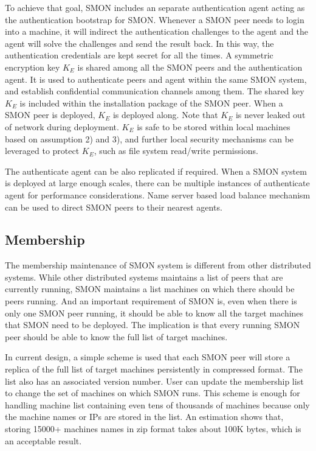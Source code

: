 To achieve that goal, SMON includes an separate
authentication agent acting as the authentication bootstrap
for SMON.  Whenever a SMON peer needs to login into a
machine, it will indirect the authentication challenges to
the agent and the agent will solve the challenges and send
the result back. In this way, the authentication credentials
are kept secret for all the times. A symmetric encryption
key $K_E$ is shared among all the SMON peers and the
authentication agent. It is used to authenticate peers and
agent within the same SMON system, and establish
confidential communication channels among them. The shared
key $K_E$ is included within the installation package of the
SMON peer. When a SMON peer is deployed, $K_E$ is deployed
along. Note that $K_E$ is never leaked out of network during
deployment. $K_E$ is safe to be stored within local machines
based on assumption 2) and 3), and further local security
mechanisms can be leveraged to protect $K_E$, such as file
system read/write permissions.


The authenticate agent can be also replicated if required.
When a SMON system is deployed at large enough scales, there
can be multiple instances of authenticate agent for
performance considerations. Name server based load balance
mechanism\cite{} can be used to direct SMON peers to their
nearest agents.

\subsection{Membership}

The membership maintenance of SMON system is different from
other distributed systems. While other distributed systems
maintains a list of peers that are currently running, SMON
maintains a list machines on which there should be peers
running.  And an important requirement of SMON is, even when
there is only one SMON peer running, it should be able to
know all the target machines that SMON need to be deployed.
The implication is that every running SMON peer should be
able to know the full list of target machines.

In current design, a simple scheme is used that each SMON
peer will store a replica of the full list of target
machines persistently in compressed format. The list also
has an associated version number. User can update the
membership list to change the set of machines on which SMON
runs.
This scheme is enough for handling machine list containing
even tens of thousands of machines because only the machine
names or IPs are stored in the list.  An estimation shows
that, storing 15000+ machines names in zip format takes
about 100K bytes, which is an acceptable result.

